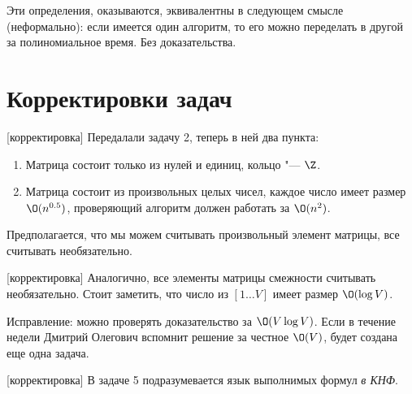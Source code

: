 \begin{Rem}
	Эти определения, оказываются, эквивалентны в следующем смысле (неформально):
	если имеется один алгоритм, то его можно переделать в другой за полиномиальное время.
	Без доказательства.
\end{Rem}

\section{Корректировки задач}
[корректировка]
	Передалали задачу 2, теперь в ней два пункта:
	\begin{enumerate}
		\item Матрица состоит только из нулей и единиц, кольцо "--- $\Z$.
		\item
			Матрица состоит из произвольных целых чисел, каждое число имеет размер $\O(n^{0.5})$,
			проверяющий алгоритм должен работать за $\O(n^2)$.
	\end{enumerate}
	Предполагается, что мы можем считывать произвольный элемент матрицы, все считывать необязательно.

[корректировка]
	Аналогично, все элементы матрицы смежности считывать необязательно.
	Стоит заметить, что число из $[1\dots V]$ имеет размер $\O(\log V)$.

	Исправление: можно проверять доказательство за $\O(V \log V)$.
	Если в течение недели Дмитрий Олегович вспомнит решение за честное $\O(V)$, будет создана еще одна задача.

[корректировка]
	В задаче 5 подразумевается язык выполнимых формул \textit{в КНФ}.
